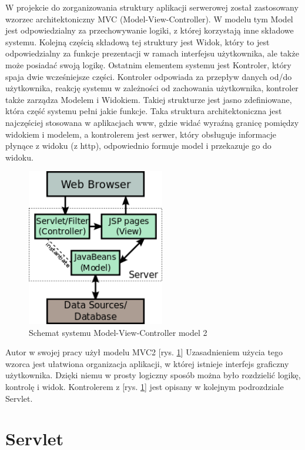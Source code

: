 \documentclass[eng,printmode,oneside]{mgr}
\begin{document}
W projekcie do zorganizowania struktury aplikacji serwerowej został zastosowany
wzorzec architektoniczny MVC (Model-View-Controller). W modelu tym Model jest
odpowiedzialny za przechowywanie logiki, z której korzystają inne składowe
systemu. Kolejną częścią składową tej struktury jest Widok, który to jest
odpowiedzialny za funkcje prezentacji w ramach interfejsu użytkownika, ale
także może posiadać swoją logikę. Ostatnim elementem systemu jest Kontroler,
który spaja dwie wcześniejsze części. Kontroler odpowiada za przepływ danych
od/do użytkownika, reakcję systemu w zależności od zachowania użytkownika,
kontroler także zarządza Modelem i Widokiem. Takiej strukturze jest jasno
zdefiniowane, która część systemu pełni jakie funkcje. Taka struktura
architektoniczna jest najczęściej stosowana w aplikacjach www, gdzie widać
wyraźną granicę pomiędzy widokiem i modelem, a kontrolerem jest serwer, który
obsługuje informacje płynące z widoku (z http), odpowiednio formuje model i
przekazuje go do widoku. \cite{java.mvc}

\begin{figure}[ht!]
\centering
\includegraphics[width=60mm]{jspModel.png}
\caption{Schemat systemu Model-View-Controller model 2\cite{java.mvc.grafika}}
\label{MVC2}
\end{figure}

Autor w swojej pracy użył modelu MVC2 [rys. \ref{MVC2}]
Uzasadnieniem użycia tego wzorca jest ułatwiona organizacja aplikacji, w której
istnieje interfejs graficzny użytkownika. Dzięki niemu w prosty logiczny sposób
można było rozdzielić logikę, kontrolę i widok. Kontrolerem z [rys. \ref{MVC2}]
jest opisany w kolejnym podrozdziale Servlet.

\section{Servlet}
\end{document}
